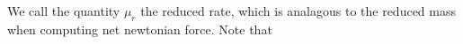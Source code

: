 We call the quantity \(\mu_r\) the reduced rate, which is analagous to the reduced mass when computing net newtonian force.  Note that